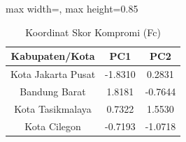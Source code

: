 \begin{table}[H]
\centering
\caption{Koordinat Skor Kompromi (Fc)} \label{tab:scores}
\begin{adjustbox}{max width=\textwidth, max height=0.85\textheight}
\begin{tabular}{|c|c|c|}
\hline
\textbf{Kabupaten/Kota} & \textbf{PC1} & \textbf{PC2} \\
\hline
Kota Jakarta Pusat & -1.8310 & 0.2831 \\
Bandung Barat & 1.8181 & -0.7644 \\
Kota Tasikmalaya & 0.7322 & 1.5530 \\
Kota Cilegon & -0.7193 & -1.0718 \\
\hline
\end{tabular}
\end{adjustbox}
\end{table}